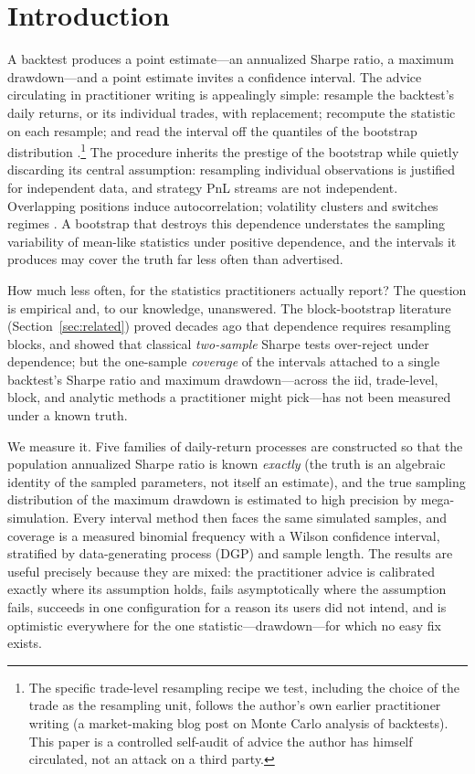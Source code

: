 \documentclass[11pt]{article}
\begin{document}
\section{Introduction}

A backtest produces a point estimate---an annualized Sharpe ratio, a maximum
drawdown---and a point estimate invites a confidence interval. The advice
circulating in practitioner writing is appealingly simple: resample the
backtest's daily returns, or its individual trades, with replacement; recompute
the statistic on each resample; and read the interval off the quantiles of the
bootstrap distribution \citep{aronson2006evidence}.\footnote{The specific
trade-level resampling recipe we test, including the choice of the trade as the
resampling unit, follows the author's own earlier practitioner writing (a
market-making blog post on Monte Carlo analysis of backtests). This paper is a
controlled self-audit of advice the author has himself circulated, not an
attack on a third party.} The procedure inherits the prestige of the bootstrap
\citep{efron1979bootstrap} while quietly discarding its central assumption:
resampling individual observations is justified for independent data, and
strategy PnL streams are not independent. Overlapping positions induce
autocorrelation; volatility clusters \citep{bollerslev1986generalized} and
switches regimes \citep{hamilton1989new}. A bootstrap that destroys this
dependence understates the sampling variability of mean-like statistics under
positive dependence, and the intervals it produces may cover the truth far less
often than advertised.

How much less often, for the statistics practitioners actually report? The
question is empirical and, to our knowledge, unanswered. The block-bootstrap
literature (Section~\ref{sec:related}) proved decades ago that dependence
requires resampling blocks, and \citet{ledoit2008robust} showed that classical
\emph{two-sample} Sharpe tests over-reject under dependence; but the one-sample
\emph{coverage} of the intervals attached to a single backtest's Sharpe ratio
and maximum drawdown---across the iid, trade-level, block, and analytic methods
a practitioner might pick---has not been measured under a known truth.

We measure it. Five families of daily-return processes are constructed so that
the population annualized Sharpe ratio is known \emph{exactly} (the truth is an
algebraic identity of the sampled parameters, not itself an estimate), and the
true sampling distribution of the maximum drawdown is estimated to high
precision by mega-simulation. Every interval method then faces the same
simulated samples, and coverage is a measured binomial frequency with a Wilson
confidence interval, stratified by data-generating process (DGP) and sample
length. The results are useful precisely because they are mixed: the
practitioner advice is calibrated exactly where its assumption holds, fails
asymptotically where the assumption fails, succeeds in one configuration for a
reason its users did not intend, and is optimistic everywhere for the one
statistic---drawdown---for which no easy fix exists.
\end{document}
